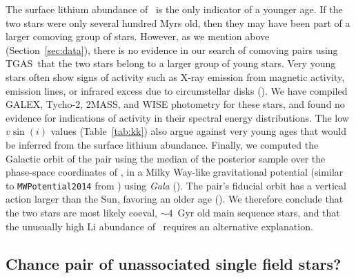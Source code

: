 \documentclass[modern, letterpaper]{aastex61}
\newcommand{\project}[1]{\textsl{#1}}
\newcommand{\acronym}[1]{{\small{#1}}}
\newcommand{\sectionname}{Section}
\newcommand{\tgas}{\acronym{TGAS}}
\newcommand*\elem[1]{\ensuremath{\mathrm{#1}}}
\newcommand{\sunanalog}{\text{Krios}}
\newcommand{\bizarreone}{\text{Kronos}}
\renewcommand\tablename{Table}
\begin{document}
The surface lithium abundance of \bizarreone\ is the only indicator of a
younger age.
If the two stars were only several hundred Myrs old, then
they may have been part of a larger comoving group of stars.
However, as we mention above (\sectionname~\ref{sec:data}), there is no
evidence in our search of comoving pairs using \tgas\ that the two stars belong
to a larger group of young stars.
Very young stars often show signs of activity such as
X-ray emission from magnetic activity, emission lines, or infrared excess due to
circumstellar disks (\citealt{1999ARA&A..37..363F,1987ApJ...312..788A}).
We have compiled GALEX, Tycho-2, 2MASS, and WISE photometry for these stars,
and found no evidence for indications of activity in their spectral energy
distributions.
%
The low $v\sin(i)$ values (\tablename~\ref{tab:kk}) also argue against very
young ages that would be inferred from the surface lithium abundance.
Finally, we computed the Galactic orbit of the pair using the median of the
posterior sample over the phase-space coordinates of \sunanalog, in a Milky
Way-like gravitational potential (similar to \texttt{MWPotential2014} from
\citealt{Bovy:2015}) using \project{Gala} (\citealt{gala}).
The pair's fiducial orbit has a vertical action larger than the Sun, favoring
an older age (\citealt{Wielen:1977,Aumer:2016}).
We therefore conclude that the two stars are most likely coeval, $\sim 4$~Gyr
old main sequence stars, and that the unusually high \elem{Li} abundance of
\bizarreone\ requires an alternative explanation.


\subsection{Chance pair of unassociated single field stars?}
\label{sub:chance_pair}
\end{document}
